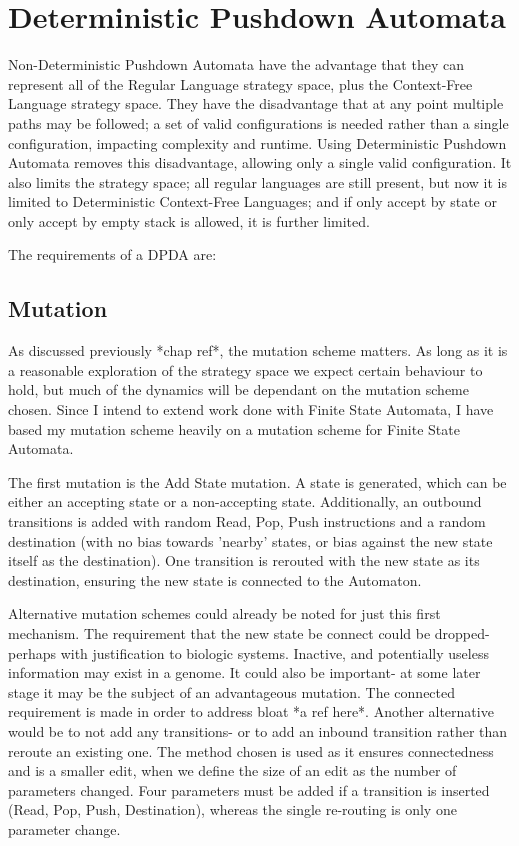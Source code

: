 \documentclass[a4paper,11pt,bcshonoursthesis,singlespace,twoside]{cssethesis}
\begin{document}
\section{Deterministic Pushdown Automata}
Non-Deterministic Pushdown Automata have the advantage that they can represent all of the Regular Language strategy space, plus the Context-Free Language strategy space. They have the disadvantage that at any point multiple paths may be followed; a set of valid configurations is needed rather than a single configuration, impacting complexity and runtime. Using Deterministic Pushdown Automata removes this disadvantage, allowing only a single valid configuration. 
It also limits the strategy space; all regular languages are still present, but now it is limited to Deterministic Context-Free Languages; and if only accept by state or only accept by empty stack is allowed, it is further limited. 

The requirements of a DPDA are:



\subsection{Mutation}
As discussed previously *chap ref*, the mutation scheme matters. As long as it is a reasonable exploration of the strategy space we expect certain behaviour to hold, but much of the dynamics will be dependant on the mutation scheme chosen. Since I intend to extend work done with Finite State Automata, I have based my mutation scheme heavily on a mutation scheme for Finite State Automata.

The first mutation is the Add State mutation. A state is generated, which can be either an accepting state or a non-accepting state. Additionally, an outbound transitions is added with random Read, Pop, Push instructions and a random destination (with no bias towards 'nearby' states, or bias against the new state itself as the destination). One transition is rerouted with the new state as its destination, ensuring the new state is connected to the Automaton. 

Alternative mutation schemes could already be noted for just this first mechanism. 
The requirement that the new state be connect could be dropped- perhaps with justification to biologic systems. Inactive, and potentially useless information may exist in a genome. 
It could also be important- at some later stage it may be the subject of an advantageous mutation. 
The connected requirement is made in order to address bloat *a ref here*. 
Another alternative would be to not add any transitions- or to add an inbound transition rather than reroute an existing one. The method chosen is used as it ensures connectedness and is a smaller edit, when we define the size of an edit as the number of parameters changed. Four parameters must be added if a transition is inserted (Read, Pop, Push, Destination), whereas the single re-routing is only one parameter change.
\end{document}

